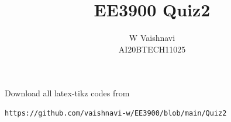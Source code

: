 \documentclass[journal,12pt,twocolumn]{IEEEtran}
\DeclareMathOperator*{\Res}{Res}
\begin{document}
\newtheorem{lemma}{Lemma}[section]
\newcommand{\BEQA}{\begin{eqnarray}}
\newcommand{\EEQA}{\end{eqnarray}}
\newcommand{\define}{\stackrel{\triangle}{=}}

\raggedbottom
\setlength{\parindent}{0pt}
\providecommand{\mbf}{\mathbf}
\providecommand{\pr}[1]{\ensuremath{\Pr\left(#1\right)}}
\providecommand{\qfunc}[1]{\ensuremath{Q\left(#1\right)}}
\providecommand{\sbrak}[1]{\ensuremath{{}\left[#1\right]}}
\providecommand{\lsbrak}[1]{\ensuremath{{}\left[#1\right.}}
\providecommand{\rsbrak}[1]{\ensuremath{{}\left.#1\right]}}
\providecommand{\brak}[1]{\ensuremath{\left(#1\right)}}
\providecommand{\lbrak}[1]{\ensuremath{\left(#1\right.}}
\providecommand{\rbrak}[1]{\ensuremath{\left.#1\right)}}
\providecommand{\cbrak}[1]{\ensuremath{\left\{#1\right\}}}
\providecommand{\lcbrak}[1]{\ensuremath{\left\{#1\right.}}
\providecommand{\rcbrak}[1]{\ensuremath{\left.#1\right\}}}
\theoremstyle{remark}
\newtheorem{rem}{Remark}
\newcommand{\sgn}{\mathop{\mathrm{sgn}}}
\providecommand{\abs}[1]{\vert#1\vert}
\providecommand{\res}[1]{\Res\displaylimits_{#1}} 
\providecommand{\norm}[1]{\lVert#1\rVert}
\providecommand{\sinc}{sinc}
\providecommand{\mtx}[1]{\mathbf{#1}}
\providecommand{\mean}[1]{E[ #1 ]}
\providecommand{\fourier}{\overset{\mathcal{F}}{ \rightleftharpoons}}
\providecommand{\system}{\overset{\mathcal{H}}{ \longleftrightarrow}}
\newcommand{\solution}{\noindent \textbf{Solution: }}
\newcommand{\cosec}{\,\text{cosec}\,}
\providecommand{\dec}[2]{\ensuremath{\overset{#1}{\underset{#2}{\gtrless}}}}
\newcommand{\myvec}[1]{\ensuremath{\begin{pmatrix}#1\end{pmatrix}}}
\newcommand{\mydet}[1]{\ensuremath{\begin{vmatrix}#1\end{vmatrix}}}
\makeatletter
{}
\makeatother
\let\StandardTheFigure\thefigure
\let\vec\mathbf
\renewcommand{\thefigure}{\theproblem}
\def\putbox#1#2#3{\makebox[0in][l]{\makebox[#1][l]{}\raisebox{\baselineskip}[0in][0in]{\raisebox{#2}[0in][0in]{#3}}}}
     \def\rightbox#1{\makebox[0in][r]{#1}}
     \def\centbox#1{\makebox[0in]{#1}}
     \def\topbox#1{\raisebox{-\baselineskip}[0in][0in]{#1}}
     \def\midbox#1{\raisebox{-0.5\baselineskip}[0in][0in]{#1}}
\vspace{3cm}
\title{EE3900 Quiz2}
\author{W Vaishnavi\\AI20BTECH11025}
\maketitle
\newpage
\bigskip
\renewcommand{\thefigure}{\theenumi}
\renewcommand{\thetable}{\theenumi}
Download all latex-tikz codes from 
%
\begin{lstlisting}
https://github.com/vaishnavi-w/EE3900/blob/main/Quiz2
\end{lstlisting}
\end{document}
